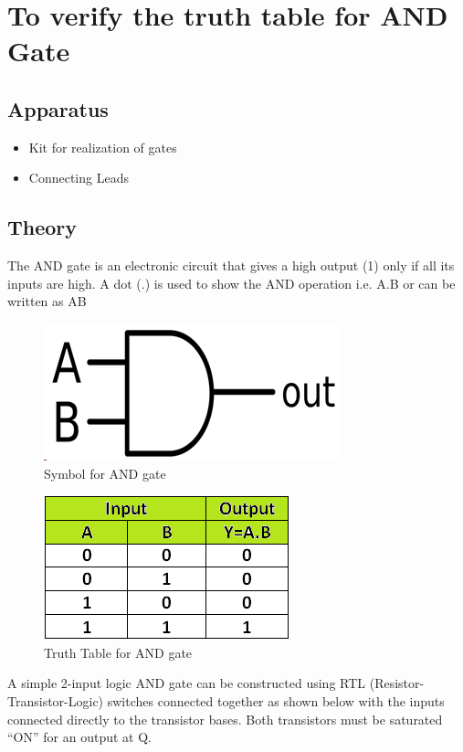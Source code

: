 \chapter{To verify the truth table for AND Gate}


\section{Apparatus}
	\begin{itemize}
		\tightlist
		\item Kit for realization of gates
		\item Connecting Leads
	\end{itemize}

\section{Theory}
	The AND gate is an electronic circuit that gives a high output (1) only if all its inputs are high. A dot (.) is used to show the AND operation i.e. A.B or can be written as AB
	\begin{figure}[h]
		\centering
		\includegraphics{img/exp1/1}
		\caption{Symbol for AND gate}
		\label{fig:and_gate}
	\end{figure}
	\begin{figure}[h]
		\centering
		\includegraphics{img/exp1/2}
		\caption{Truth Table for AND gate}
		\label{fig:and_gate_table}
	\end{figure}
	A simple 2-input logic AND gate can be constructed using RTL (Resistor-Transistor-Logic) switches connected together as shown below with the inputs connected directly to the transistor bases. Both transistors must be saturated “ON” for an output at Q.
	
